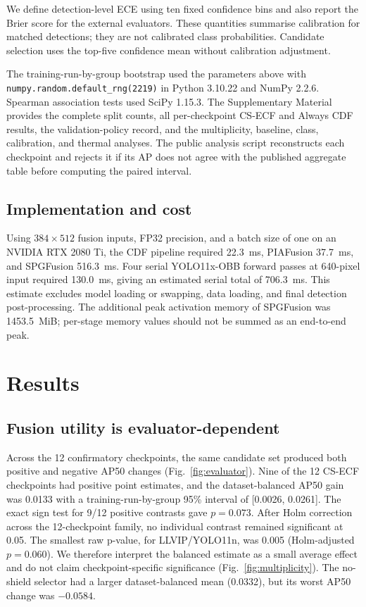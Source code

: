\documentclass[preprint,11pt]{elsarticle}
\begin{document}
We define detection-level ECE using ten fixed confidence bins and also report
the Brier score for the external evaluators. These quantities summarise
calibration for matched detections; they are not calibrated class
probabilities. Candidate selection uses the top-five confidence mean without
calibration adjustment.

The training-run-by-group bootstrap used the parameters above with
\texttt{numpy.random.default\_rng(2219)} in Python 3.10.22 and NumPy 2.2.6.
Spearman association tests used SciPy 1.15.3.
The Supplementary Material provides the complete split counts, all
per-checkpoint CS-ECF and Always CDF results, the validation-policy record, and
the multiplicity, baseline, class, calibration, and thermal analyses. The
public analysis script reconstructs each checkpoint
and rejects it if its AP does not agree with the published aggregate table
before computing the paired interval.

\subsection{Implementation and cost}

Using \(384\times512\) fusion inputs, FP32 precision, and a batch size of one on
an NVIDIA RTX 2080 Ti, the CDF pipeline required \SI{22.3}{ms}, PIAFusion
\SI{37.7}{ms}, and SPGFusion \SI{516.3}{ms}. Four serial YOLO11x-OBB forward
passes at 640-pixel input required \SI{130.0}{ms}, giving an estimated serial
total of \SI{706.3}{ms}. This estimate excludes model loading or swapping, data
loading, and final detection post-processing. The additional peak activation
memory of SPGFusion was \SI{1453.5}{MiB}; per-stage memory values should not be
summed as an end-to-end peak.

\section{Results}

\subsection{Fusion utility is evaluator-dependent}

Across the 12 confirmatory checkpoints, the same candidate set produced both
positive and negative AP50 changes (Fig.~\ref{fig:evaluator}). Nine of the 12
CS-ECF checkpoints had positive point estimates, and the dataset-balanced AP50
gain was 0.0133 with a training-run-by-group 95\% interval of
[0.0026, 0.0261]. The exact sign test for 9/12 positive contrasts gave
\(p=0.073\). After Holm correction across the 12-checkpoint family, no
individual contrast remained significant at 0.05. The smallest raw p-value,
for LLVIP/YOLO11n, was 0.005 (Holm-adjusted \(p=0.060\)). We therefore
interpret the balanced estimate as a small average effect and do not claim
checkpoint-specific significance (Fig.~\ref{fig:multiplicity}). The no-shield
selector had a larger dataset-balanced mean (0.0332), but its worst AP50 change
was \(-0.0584\).
\end{document}
